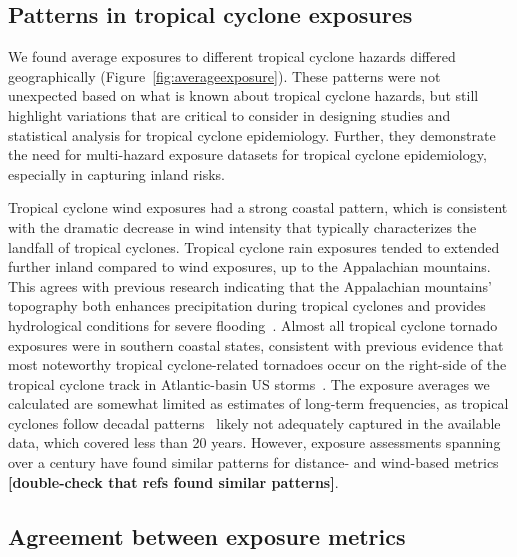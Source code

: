 \subsection*{Patterns in tropical cyclone exposures}

We found average exposures to different tropical cyclone hazards differed
geographically (Figure~\ref{fig:averageexposure}). These patterns were not
unexpected based on what is known about tropical cyclone hazards, but still
highlight variations that are critical to consider in designing studies and
statistical analysis for tropical cyclone epidemiology. Further, they
demonstrate the need for multi-hazard exposure datasets for tropical cyclone
epidemiology, especially in capturing inland risks. 

Tropical cyclone wind exposures had a strong coastal pattern, which is
consistent with the dramatic decrease in wind intensity that typically
characterizes the landfall of tropical cyclones.  Tropical cyclone rain
exposures tended to extended further inland compared to wind exposures, up to
the Appalachian mountains. This agrees with previous research indicating that
the Appalachian mountains' topography both enhances precipitation during
tropical cyclones and provides hydrological conditions for severe
flooding~\parencite{rees2001}.  Almost all tropical cyclone tornado exposures
were in southern coastal states, consistent with previous evidence that most
noteworthy tropical cyclone-related tornadoes occur on the right-side of the
tropical cyclone track in Atlantic-basin \ac{US} storms~\parencite{moore2012}.
The exposure averages we calculated are somewhat limited as estimates of
long-term frequencies, as tropical cyclones follow decadal
patterns~\parencite{kossin2007more} likely not adequately captured in the
available data, which covered less than 20 years. However, exposure assessments
spanning over a century have found similar patterns for distance- and
wind-based metrics~\textcite{zandbergen2009, kruk2010} \textbf{[double-check
that refs found similar patterns]}.

\subsection*{Agreement between exposure metrics}

